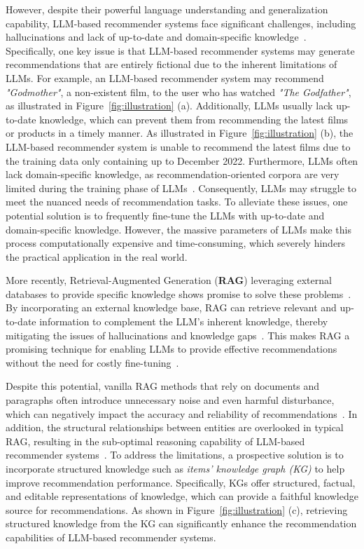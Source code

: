 However, despite their powerful language understanding and generalization capability, LLM-based recommender systems face significant challenges, including hallucinations and lack of up-to-date and domain-specific knowledge~\citep{luo2023reasoning}. 
Specifically, one key issue is that LLM-based recommender systems may generate recommendations that are entirely fictional due to the inherent limitations of LLMs.
For example, an LLM-based recommender system may recommend \textit{"Godmother"}, a non-existent film, to the user who has watched \textit{"The Godfather"}, as illustrated in Figure~\ref{fig:illustration} (a). 
Additionally, LLMs usually lack up-to-date knowledge, which can prevent them from recommending the latest films or products in a timely manner. 
As illustrated in Figure~\ref{fig:illustration} (b), the LLM-based recommender system is unable to recommend the latest films due to the training data only containing up to December 2022. 
Furthermore, LLMs often lack domain-specific knowledge, as recommendation-oriented corpora are very limited during the training phase of LLMs~\citep{geng2022recommendation}. 
Consequently, LLMs may struggle to meet the nuanced needs of recommendation tasks. 
To alleviate these issues, one potential solution is to frequently fine-tune the LLMs with up-to-date and domain-specific knowledge. However, the massive parameters of LLMs make this process computationally expensive and time-consuming, which severely hinders the practical application in the real world.







More recently, Retrieval-Augmented Generation (\textbf{RAG}) leveraging external databases to provide specific knowledge shows promise to solve these problems~\citep{fan2024survey,gao2023retrieval}.
By incorporating an external knowledge base, RAG can retrieve relevant and up-to-date information to complement the LLM's inherent knowledge, thereby mitigating the issues of hallucinations and knowledge gaps~\citep{khandelwal2019generalization,min2020ambigqa,li2024empowering}. This makes RAG a promising technique for enabling LLMs to provide effective recommendations without the need for costly fine-tuning~\citep{ram2023context}.

Despite this potential, vanilla RAG methods that rely on documents and paragraphs often introduce unnecessary noise and even harmful disturbance, which can negatively impact the accuracy and reliability of recommendations~\citep{he2024g}. 
In addition, the structural relationships between entities are overlooked in typical RAG, resulting in the sub-optimal reasoning capability of LLM-based recommender systems~\citep{luo2023reasoning}.
To address the limitations, a prospective solution is to incorporate structured knowledge such as \emph{items' knowledge graph (KG)} to help improve recommendation performance. 
Specifically, KGs offer structured, factual, and editable representations of knowledge, which can provide a faithful knowledge source for recommendations.
As shown in Figure~\ref{fig:illustration} (c), retrieving structured knowledge from the KG can significantly enhance the recommendation capabilities of LLM-based recommender systems.


